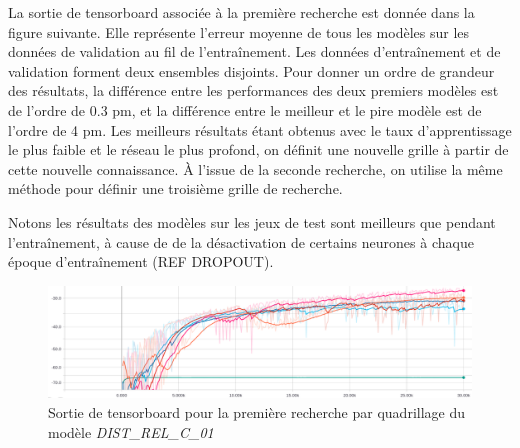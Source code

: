 \par La sortie de tensorboard associée à la première recherche est donnée dans la figure suivante. Elle représente l'erreur moyenne de tous les modèles sur les données de validation au fil de l'entraînement. Les données d'entraînement et de validation forment deux ensembles disjoints. Pour donner un ordre de grandeur des résultats, la différence entre les performances des deux premiers modèles est de l'ordre de 0.3 pm, et la différence entre le meilleur et le pire modèle est de l'ordre de 4 pm. Les meilleurs résultats étant obtenus avec le taux d'apprentissage le plus faible et le réseau le plus profond, on définit une nouvelle grille à partir de cette nouvelle connaissance. À l'issue de la seconde recherche, on utilise la même méthode pour définir une troisième grille de recherche.
\par Notons les résultats des modèles sur les jeux de test sont meilleurs que pendant l'entraînement, à cause de de la désactivation de certains neurones à chaque époque d'entraînement (REF DROPOUT).

\vspace{0.5cm}

\begin{figure}[!h]
	\centering
	\includegraphics[scale=0.35]{images/tboard.png}
	\caption{Sortie de tensorboard pour la première recherche par quadrillage du modèle \emph{DIST\_REL\_C\_01}}
\end{figure}

